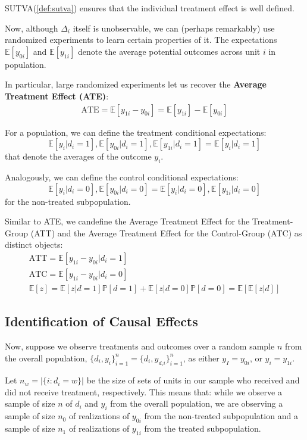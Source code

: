 SUTVA(\ref{def:sutva}) ensures that the individual treatment effect is well defined.

Now, although $\Delta_i$ itself is unobservable, we can (perhaps remarkably) 
use randomized experiments to learn certain properties of it. The expectations
$\mathbb{E}[y_{0i}]$ and $\mathbb{E}[y_{1i}]$ denote the average potential outcomes across unit $i$ in population.

In particular, large randomized experiments let us recover the \textbf{Average
Treatment Effect (ATE)}:
\begin{gather*}
  \text{ATE} = \mathbb{E}[y_{1i} - y_{0i}] = \mathbb{E}[y_{1i}] - \mathbb{E}[y_{0i}]
\end{gather*}

For a population, we can define the treatment conditional expectations:
\[\mathbb{E}[y_i | d_i=1], \mathbb{E}[y_{0i} | d_i=1 ], \mathbb{E}[y_{1i} | d_i=1 ] = \mathbb{E}[y_i | d_i=1]\]
that denote the averages of the outcome $y_i$.

Analogously, we can define the control conditional expectations:
\[\mathbb{E}[y_i | d_i=0], \mathbb{E}[y_{0i} | d_i=0 ] = \mathbb{E}[y_i | d_i=0], \mathbb{E}[y_{1i} | d_i=0 ]\]
for the non-treated subpopulation.

Similar to ATE, we candefine the Average Treatment Effect for the Treatment-Group (ATT) and the Average
Treatment Effect for the Control-Group (ATC) as distinct objects:
\begin{gather*}
  \text{ATT} = \mathbb{E}[y_{1i}- y_{0i} | d_i=1]\\
  \text{ATC} = \mathbb{E}[y_{1i}- y_{0i} | d_i=0] \\
  \mathbb{E}[z] = \mathbb{E}[z|d=1] \mathbb{P}[d=1] + \mathbb{E}[z|d=0] \mathbb{P}[d=0] = \mathbb{E}[\mathbb{E}[z|d]]
\end{gather*}

\subsection{Identification of Causal Effects}

Now, suppose we observe treatments and outcomes over a random sample $n$ from the overall population, $\{d_i, y_i\}_{i=1}^n = \{d_i, y_{d_{i}i}\}_{i=1}^n$, 
as either $y_I = y_{0i} $, or $y_i = y_{1i}$. 

Let $n_{w} = \vert \{ i: d_i = w \} \vert $ be the size of sets of units in our
sample who received and did not receive treatment, respectively.
This means that: while we observe a sample of size $n$ of $d_i$ and $y_i$ from the overall population,
we are observing a sample of size $n_0$ of realizations of $y_{0i}$ from the non-treated subpopulation 
and a sample of size $n_1$ of realizations of $y_{1i}$ from the treated subpopulation.

